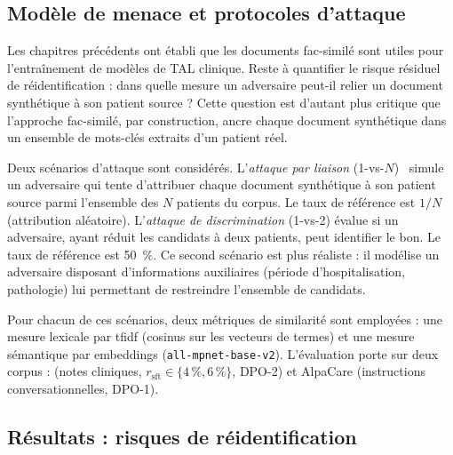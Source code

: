 

\subsection{Modèle de menace et protocoles d'attaque}

Les chapitres précédents ont établi que les documents fac-similé sont utiles pour l'entraînement de modèles de TAL clinique.
Reste à quantifier le risque résiduel de réidentification : dans quelle mesure un adversaire peut-il relier un document synthétique à son patient source ?
Cette question est d'autant plus critique que l'approche fac-similé, par construction, ancre chaque document synthétique dans un ensemble de mots-clés extraits d'un patient réel.

Deux scénarios d'attaque sont considérés.
L'\emph{attaque par liaison} (1-vs-$N$)~\citep{narayanan2008robust} simule un adversaire qui tente d'attribuer chaque document synthétique à son patient source parmi l'ensemble des $N$ patients du corpus.
Le taux de référence est $1/N$ (attribution aléatoire).
L'\emph{attaque de discrimination} (1-vs-2) évalue si un adversaire, ayant réduit les candidats à deux patients, peut identifier le bon.
Le taux de référence est \SI{50}{\percent}.
Ce second scénario est plus réaliste : il modélise un adversaire disposant d'informations auxiliaires (période d'hospitalisation, pathologie) lui permettant de restreindre l'ensemble de candidats.

Pour chacun de ces scénarios, deux métriques de similarité sont employées : une mesure lexicale par \gls{tfidf} (cosinus sur les vecteurs de termes) et une mesure sémantique par embeddings (\verb|all-mpnet-base-v2|).
L'évaluation porte sur deux corpus : \mimic{} (notes cliniques, $r_{\text{sft}} \in \{4\,\%, 6\,\%\}$, DPO-2) et AlpaCare (instructions conversationnelles, DPO-1).

\subsection{Résultats : risques de réidentification}

